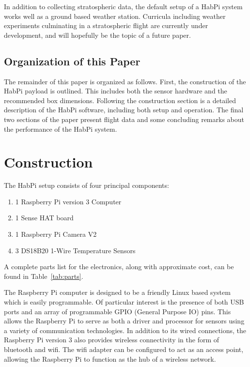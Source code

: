 \documentclass[journal]{new-aiaa}
\begin{document}
In addition to collecting stratospheric data, the default setup of
a HabPi system works well as a ground based weather station.
Curricula including weather experiments culminating in a stratospheric
flight are currently under development, and will hopefully be the topic
of a future paper.

\subsection{Organization of this Paper}
The remainder of this paper is organized as follows.  First, the
construction of the HabPi payload is outlined.  This includes both the
sensor hardware and the recommended box dimensions.  Following the
construction section is a detailed description of the HabPi software,
including both setup and operation.  The final two sections of the
paper present flight data and some concluding remarks about the
performance of the HabPi system. 

\section{Construction}
The HabPi setup consists of four principal components:
\begin{enumerate}
    \item 1 Raspberry Pi version 3 Computer~\cite{RaspberryPi}
    \item 1 Sense HAT board~\cite{SenseHat}
    \item 1 Raspberry Pi Camera V2~\cite{RaspberryPi}
    \item 3 DS18B20 1-Wire Temperature Sensors~\cite{DS18B20}
\end{enumerate}
A complete parts list for the electronics, along with approximate
cost, can be found in Table~\ref{tab:parts}.

The Raspberry Pi computer is designed to be a friendly Linux based
system which is easily programmable.  Of particular interest is the
presence of both USB ports and an array of programmable GPIO (General
Purpose IO) pins.  This allows the Raspberry Pi to serve as both
a driver and processor for sensors using a variety of communication
technologies.  In addition to its wired connections, the Raspberry Pi
version 3 also provides wireless connectivity in the form of bluetooth
and wifi.  The wifi adapter can be configured to act as an 
access point, allowing the Raspberry Pi to function as the hub of
a wireless network.
\end{document}
